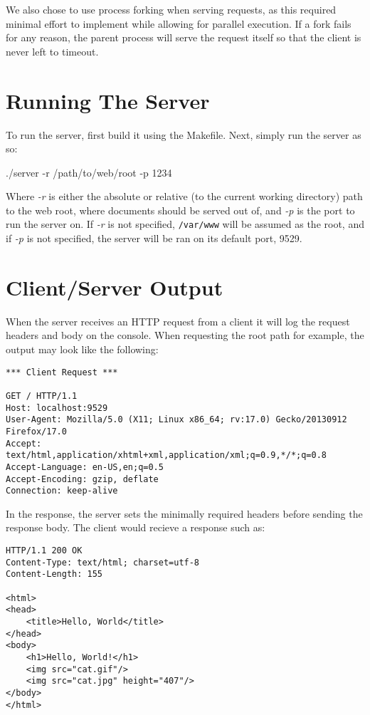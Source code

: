 \documentclass[12pt]{article}
\begin{document}
We also chose to use process forking when serving requests, as this required minimal effort to implement while allowing for parallel execution. If a fork fails for any reason, the parent process will serve the request itself so that the client is never left to timeout.

\section{Running The Server}
To run the server, first build it using the Makefile.
Next, simply run the server as so:

./server -r /path/to/web/root -p 1234

Where \emph{-r} is either the absolute or relative (to the current working directory) path to the web root, where documents should be served out of, and \emph{-p} is the port to run the server on. If \emph{-r} is not specified, {\tt /var/www} will be assumed as the root, and if \emph{-p} is not specified, the server will be ran on its default port, 9529.

\section{Client/Server Output}
When the server receives an HTTP request from a client it will log the request headers and body on the console. When requesting the root path for example, the output may look like the following:

\begin{verbatim}
*** Client Request ***

GET / HTTP/1.1
Host: localhost:9529
User-Agent: Mozilla/5.0 (X11; Linux x86_64; rv:17.0) Gecko/20130912 Firefox/17.0
Accept: text/html,application/xhtml+xml,application/xml;q=0.9,*/*;q=0.8
Accept-Language: en-US,en;q=0.5
Accept-Encoding: gzip, deflate
Connection: keep-alive
\end{verbatim}

In the response, the server sets the minimally required headers before sending the response body. The client would recieve a response such as:

\begin{verbatim}
HTTP/1.1 200 OK
Content-Type: text/html; charset=utf-8
Content-Length: 155

<html>
<head>
    <title>Hello, World</title>
</head>
<body>
    <h1>Hello, World!</h1>
    <img src="cat.gif"/>
    <img src="cat.jpg" height="407"/>
</body>
</html>
\end{verbatim}
\end{document}
